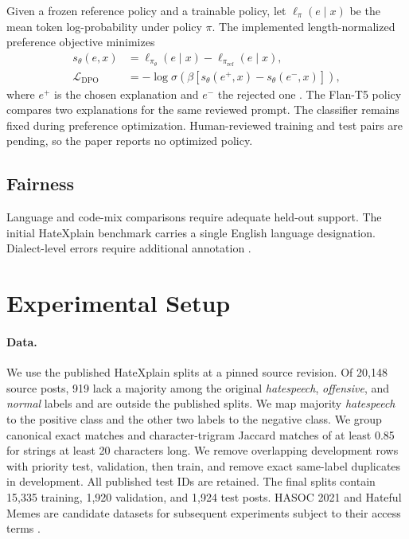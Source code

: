 \documentclass[11pt]{article}
\begin{document}
Given a frozen reference policy and a trainable policy, let \(\ell_\pi(e\mid x)\) be the mean token log-probability under policy \(\pi\). The implemented length-normalized preference objective minimizes
\begin{equation}
\begin{aligned}
s_\theta(e,x)&=\ell_{\pi_\theta}(e\mid x)-\ell_{\pi_{\mathrm{ref}}}(e\mid x), \\
\mathcal{L}_{\mathrm{DPO}} &=
 -\log\sigma\!\left(\beta[s_\theta(e^+,x)-s_\theta(e^-,x)]\right),
\end{aligned}
\end{equation}
where \(e^+\) is the chosen explanation and \(e^-\) the rejected one \cite{rafailov2023dpo}. The Flan-T5 policy compares two explanations for the same reviewed prompt. The classifier remains fixed during preference optimization. Human-reviewed training and test pairs are pending, so the paper reports no optimized policy.

\subsection{Fairness}
Language and code-mix comparisons require adequate held-out support. The initial HateXplain benchmark carries a single English language designation. Dialect-level errors require additional annotation \cite{sap2019racial,borkan2019nuanced}.

\section{Experimental Setup}

\paragraph{Data.}
We use the published HateXplain splits \cite{mathew2021hatexplain} at a pinned source revision. Of 20,148 source posts, 919 lack a majority among the original \textit{hatespeech}, \textit{offensive}, and \textit{normal} labels and are outside the published splits. We map majority \textit{hatespeech} to the positive class and the other two labels to the negative class. We group canonical exact matches and character-trigram Jaccard matches of at least 0.85 for strings at least 20 characters long. We remove overlapping development rows with priority test, validation, then train, and remove exact same-label duplicates in development. All published test IDs are retained. The final splits contain 15,335 training, 1,920 validation, and 1,924 test posts. HASOC 2021 and Hateful Memes are candidate datasets for subsequent experiments subject to their access terms \cite{mandl2021hasoc,kiela2020hatefulmemes}.
\end{document}
